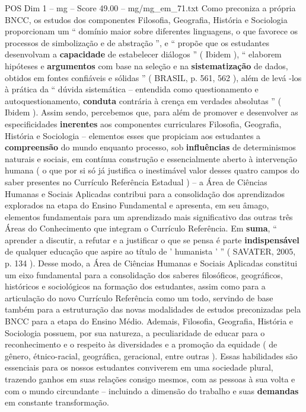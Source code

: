\begin{textsample}{POS Dim 1 – mg – Score 49.00 – mg/mg\_em\_71.txt}
Como preconiza a própria BNCC, os estudos dos componentes Filosofia, Geografia, História e Sociologia proporcionam um “ domínio maior sobre diferentes linguagens, o que favorece os processos de simbolização e de abstração ”, e “ propõe que os estudantes desenvolvam a \textbf{capacidade} de estabelecer diálogos ” ( Ibidem ), “ elaborem hipóteses e \textbf{argumentos} com base na seleção e na \textbf{sistematização} de dados, obtidos em fontes confiáveis e sólidas ” ( BRASIL, p. 561, 562 ), além de levá -los à prática da “ dúvida sistemática – entendida como questionamento e autoquestionamento, \textbf{conduta} contrária à crença em verdades absolutas ” ( Ibidem ).
Assim sendo, percebemos que, para além de promover e desenvolver as especificidades \textbf{inerentes} aos componentes curriculares Filosofia, Geografia, História e Sociologia – elementos esses que propiciam aos estudantes a \textbf{compreensão} do mundo enquanto processo, sob \textbf{influências} de determinismos naturais e sociais, em contínua construção e essencialmente aberto à intervenção humana ( o que por si só já justifica o inestimável valor desses quatro campos do saber presentes no Currículo Referência Estadual ) – a Área de Ciências Humanas e Sociais Aplicadas contribui para a consolidação dos aprendizados explorados na etapa do Ensino Fundamental e apresenta, em seu âmago, elementos fundamentais para um aprendizado mais significativo das outras três Áreas do Conhecimento que integram o Currículo Referência.
Em \textbf{suma}, “ aprender a discutir, a refutar e a justificar o que se pensa é parte \textbf{indispensável} de qualquer educação que aspire ao título de ' humanista ' ” ( SAVATER, 2005, p. 134 ).
Desse modo, a Área de Ciências Humanas e Sociais Aplicadas constitui um eixo fundamental para a consolidação dos saberes filosóficos, geográficos, históricos e sociológicos na formação dos estudantes, assim como para a articulação do novo Currículo Referência como um todo, servindo de base também para a estruturação das novas modalidades de estudos preconizadas pela BNCC para a etapa do Ensino Médio.
Ademais, Filosofia, Geografia, História e Sociologia possuem, por sua natureza, a peculiaridade de educar para o reconhecimento e o respeito às diversidades e a promoção da equidade ( de gênero, étnico-racial, geográfica, geracional, entre outras ).
Essas habilidades são essenciais para os nossos estudantes conviverem em uma sociedade plural, trazendo ganhos em suas relações consigo mesmos, com as pessoas à sua volta e com o mundo circundante – incluindo a dimensão do trabalho e suas \textbf{demandas} em constante transformação.

\end{textsample}
